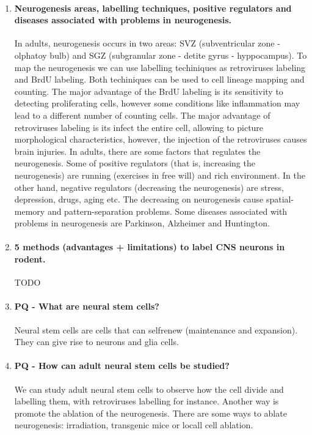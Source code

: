 \documentclass[12pt,article,oneside,a4paper]{memoir}
\begin{document}
\begin{enumerate}
\item \paragraph{Neurogenesis areas, labelling techniques, positive regulators and diseases associated with problems in neurogenesis.}
In adults, neurogenesis occurs in two areas: SVZ (subventricular zone - olphatoy bulb) and SGZ (subgranular zone - detite gyrus - hyppocampus). To map the neurogenesis we can use labelling techiniques as retroviruses labeling and BrdU labeling. Both techiniques can be used to cell lineage mapping and counting. The major advantage of the BrdU labeling is its sensitivity to detecting proliferating cells, however some conditions like inflammation may lead to a different number of counting cells. The major advantage of retroviruses labeling is its infect the entire cell, allowing to picture morphological characteristics, however, the injection of the retroviruses causes brain injuries.
In adults, there are some factors that regulates the neurogenesis. Some of positive regulators (that is, increasing the neurogenesis) are running (exercises in free will) and rich environment. In the other hand, negative regulators (decreasing the neurogenesis) are stress, depression, drugs, aging etc.
The decreasing on neurogenesis cause spatial-memory and pattern-separation problems.
Some diseases associated with problems in neurogenesis are Parkinson, Alzheimer and Huntington.

\item \paragraph{5 methods (advantages + limitations) to label CNS neurons in rodent.}
TODO

\item \paragraph{PQ - What are neural stem cells?}
Neural stem cells are cells that can self­renew (maintenance and expansion). They can give rise to neurons and glia cells.

\item \paragraph{PQ - How can adult neural stem cells be studied?} We can study adult neural stem cells to observe how the cell divide and labelling them, with retroviruses labelling for instance. Another way is promote the ablation of the neurogenesis. There are some ways to ablate neurogenesis: irradiation, transgenic mice or locall cell ablation.


\end{enumerate}
\end{document}

